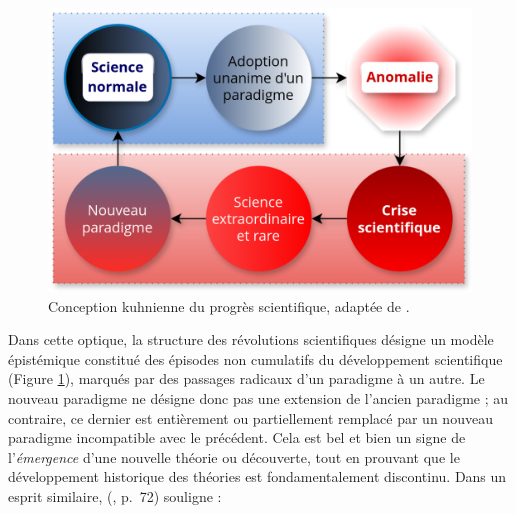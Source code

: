 \begin{figure}[h] %
    \centering
    \includegraphics[width=\linewidth]{img/changement_paradigme.png}
    \caption{Conception kuhnienne du progrès scientifique, adaptée de \citet{amiri2012}.}
    \label{fig:changement_paradigme}
\end{figure}

Dans cette optique, la structure des révolutions scientifiques désigne un modèle épistémique constitué des épisodes non cumulatifs du développement scientifique (Figure \ref{fig:changement_paradigme}), marqués par des passages radicaux d'un paradigme à un autre.  Le nouveau paradigme ne désigne donc pas une extension de l'ancien paradigme ; au contraire, ce dernier est entièrement ou partiellement remplacé par un nouveau paradigme incompatible avec le précédent. 
Cela est bel et bien un signe de l'\textit{émergence} d'une nouvelle théorie ou découverte, tout en prouvant que le développement historique des théories est fondamentalement discontinu. Dans un esprit similaire, \citeauthor{bachelard1970idealisme} (\citeyear{bachelard1970idealisme}, p.~72) souligne :


%

